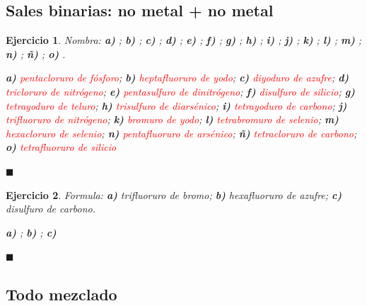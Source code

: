 \documentclass[12pt]{article}
\theoremstyle{mygreennumbox}
\newtheorem{ejercicioT}{Ejercicio}[section]
\newenvironment{exercise}{\begin{eBoxmygreen}\begin{ejercicioT}}{\hfill{\color{mygreen}\tiny\ensuremath{\blacksquare}}\end{ejercicioT}\end{eBoxmygreen}}
\begin{document}
\subsection{Sales binarias: no metal + no metal}

\begin{exercise}
    Nombra: \textbf{a)} ; \textbf{b)} ; \textbf{c)} ; \textbf{d)} ; \textbf{e)} ; \textbf{f)} ; \textbf{g)} ; \textbf{h)} ; \textbf{i)} ; \textbf{j)} ; \textbf{k)} ; \textbf{l)} ; \textbf{m)} ; \textbf{n)} ; \textbf{ñ)} ; \textbf{o)} .
    \begin{solu}
        \textbf{a)} \textcolor{red}{pentacloruro de fósforo}; \textbf{b)} \textcolor{red}{heptafluoruro de yodo}; \textbf{c)} \textcolor{red}{diyoduro de azufre}; \textbf{d)} \textcolor{red}{tricloruro de nitrógeno}; \textbf{e)} \textcolor{red}{pentasulfuro de dinitrógeno}; \textbf{f)} \textcolor{red}{disulfuro de silicio}; \textbf{g)} \textcolor{red}{tetrayoduro de teluro}; \textbf{h)} \textcolor{red}{trisulfuro de diarsénico}; \textbf{i)} \textcolor{red}{tetrayoduro de carbono}; \textbf{j)} \textcolor{red}{trifluoruro de nitrógeno}; \textbf{k)} \textcolor{red}{bromuro de yodo}; \textbf{l)} \textcolor{red}{tetrabromuro de selenio}; \textbf{m)} \textcolor{red}{hexacloruro de selenio}; \textbf{n)} \textcolor{red}{pentafluoruro de arsénico}; \textbf{ñ)} \textcolor{red}{tetracloruro de carbono}; \textbf{o)} \textcolor{red}{tetrafluoruro de silicio}
    \end{solu}
\end{exercise}

\begin{exercise}
    Formula: \textbf{a)} trifluoruro de bromo; \textbf{b)} hexafluoruro de azufre; \textbf{c)} disulfuro de carbono.
    \begin{solu}
        \textbf{a)} \textcolor{red}{}; \textbf{b)} \textcolor{red}{}; \textbf{c)} \textcolor{red}{}
    \end{solu}
\end{exercise}

\subsection{Todo mezclado}
\end{document}
